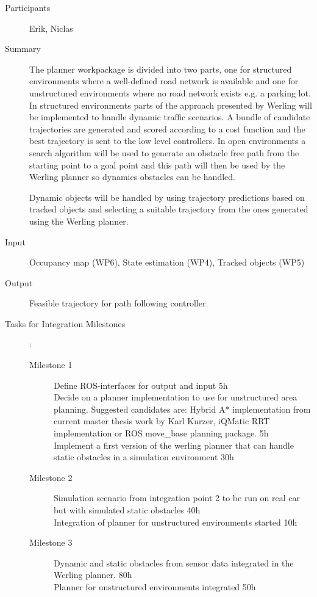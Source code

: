 \documentclass[11pt,a4paper]{article}
\begin{document}
\begin{description}
\item[Participants] Erik, Niclas
\item[Summary] The planner workpackage is divided into two parts, one
  for structured environments where a well-defined road network is
  available and one for unstructured environments where no road
  network exists e.g. a parking lot. In structured environments parts
  of the approach presented by Werling \cite{werling2011optimal} will be implemented to
  handle dynamic traffic scenarios. A bundle of candidate trajectories
  are generated and scored according to a cost function and the best
  trajectory is sent to the low level controllers. In open
  environments a search algorithm will be used to generate an obstacle
  free path from the starting point to a goal point and this path will
  then be used by the Werling planner so dynamics obstacles can be
  handled.

  Dynamic objects will be handled by using trajectory predictions based 
  on tracked objects and selecting a suitable trajectory from the ones
  generated using the Werling planner.
  
\item[Input] Occupancy map (WP6), State estimation (WP4), Tracked objects (WP5)
\item[Output] Feasible trajectory for path following controller.
\item[Tasks for Integration Milestones]:\
	\begin{description}
		\item[Milestone 1]  Define ROS-interfaces for output
                  and input 5h \\
                  
                  Decide on a planner implementation to
                  use for unstructured area planning. Suggested
                  candidates are: Hybrid A* \cite{dolgov2010path} implementation from
                  current master thesis work by Karl Kurzer, iQMatic
                  RRT implementation or ROS move\_base planning
                  package. 5h  \\
                  
                  Implement a first version of the werling
                  planner that can handle static obstacles in a
                  simulation environment 30h
		\item[Milestone 2] 
		Simulation scenario from integration
                  point 2 to be run on real car but with simulated
                  static obstacles 40h \\
                  
                  Integration of planner for
                  unstructured environments started 10h                  
		\item[Milestone 3] Dynamic and static obstacles from
                  sensor data integrated in the Werling planner. 80h \\
                  
                  Planner for unstructured environments integrated 50h
	\end{description}	 
\end{description}
\end{document}
